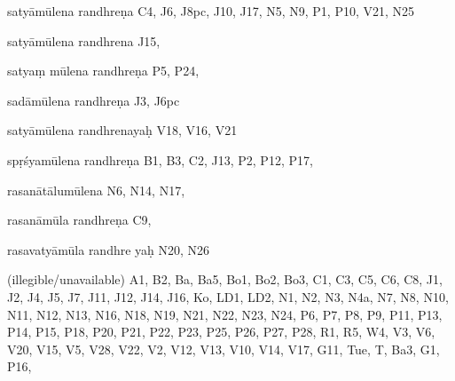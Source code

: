 \begin{marma}[hp02_009]
\begin{marma}[hp02_011]
 \begin{marma}[hp02_56*1]
\item[satyāmūlena randhreṇa] C4, J6, J8pc, J10, J17, N5, N9, P1, P10, V21, N25
\item[satyāmūlena randhrena] J15,
\item[satyaṃ mūlena randhreṇa] P5, P24, 
\item[sadāmūlena randhreṇa] J3, J6pc
\item[satyāmūlena randhrenayaḥ] V18, V16, V21
\item[spṛśyamūlena randhreṇa] B1, B3, C2, J13, P2, P12, P17, 
\item[rasanātālumūlena] N6, N14, N17, 
\item[rasanāmūla randhreṇa] C9, 
\item[rasavatyāmūla randhre yaḥ] N20, N26
\item[]
\item[]
\item[(illegible/unavailable)] A1, B2, Ba, Ba5, Bo1, Bo2, Bo3, C1, C3, C5, C6, C8, J1, J2, J4, J5, J7, J11, J12, J14, J16, Ko, LD1, LD2, N1, N2, N3, N4a, N7, N8, N10, N11, N12, N13, N16, N18, N19, N21, N22, N23, N24, P6, P7, P8, P9, P11, P13, P14, P15, P18, P20, P21, P22, P23, P25, P26, P27, P28, R1, R5, W4, V3, V6, V20, V15, V5, V28, V22, V2, V12, V13, V10, V14, V17, G11, Tue, T, Ba3, G1, P16,
  \begin{description}

    \end{description}
 \end{marma}



\end{marma}
\end{marma}
